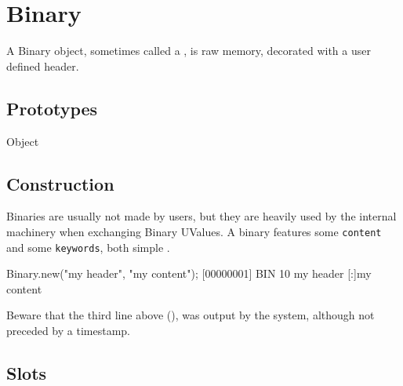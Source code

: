 
\section{Binary}

A Binary object, sometimes called a , is raw memory,
decorated with a user defined header.

\subsection{Prototypes}
\begin{refObjects}
\item[Object]
\end{refObjects}

\subsection{Construction}

Binaries are usually not made by users, but they are heavily used by
the internal machinery when exchanging Binary UValues.  A binary
features some \lstinline|content| and some \lstinline|keywords|, both
simple .

\begin{urbiscript}[firstnumber=1]
Binary.new("my header", "my content");
[00000001] BIN 10 my header
[:]my content
\end{urbiscript}

Beware that the third line above (), was output by
the system, although not preceded by a timestamp.

\subsection{Slots}


